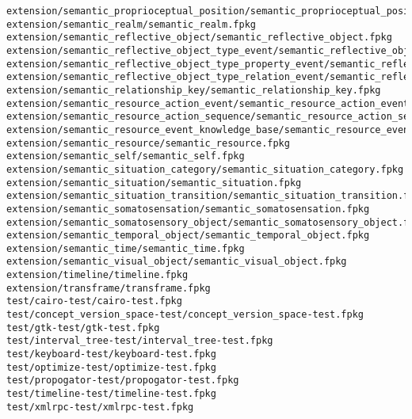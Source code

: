 \begin{lstlisting}
extension/semantic_proprioceptual_position/semantic_proprioceptual_position.fpkg
extension/semantic_realm/semantic_realm.fpkg
extension/semantic_reflective_object/semantic_reflective_object.fpkg
extension/semantic_reflective_object_type_event/semantic_reflective_object_type_event.fpkg
extension/semantic_reflective_object_type_property_event/semantic_reflective_object_type_property_event.fpkg
extension/semantic_reflective_object_type_relation_event/semantic_reflective_object_type_relation_event.fpkg
extension/semantic_relationship_key/semantic_relationship_key.fpkg
extension/semantic_resource_action_event/semantic_resource_action_event.fpkg
extension/semantic_resource_action_sequence/semantic_resource_action_sequence.fpkg
extension/semantic_resource_event_knowledge_base/semantic_resource_event_knowledge_base.fpkg
extension/semantic_resource/semantic_resource.fpkg
extension/semantic_self/semantic_self.fpkg
extension/semantic_situation_category/semantic_situation_category.fpkg
extension/semantic_situation/semantic_situation.fpkg
extension/semantic_situation_transition/semantic_situation_transition.fpkg
extension/semantic_somatosensation/semantic_somatosensation.fpkg
extension/semantic_somatosensory_object/semantic_somatosensory_object.fpkg
extension/semantic_temporal_object/semantic_temporal_object.fpkg
extension/semantic_time/semantic_time.fpkg
extension/semantic_visual_object/semantic_visual_object.fpkg
extension/timeline/timeline.fpkg
extension/transframe/transframe.fpkg
test/cairo-test/cairo-test.fpkg
test/concept_version_space-test/concept_version_space-test.fpkg
test/gtk-test/gtk-test.fpkg
test/interval_tree-test/interval_tree-test.fpkg
test/keyboard-test/keyboard-test.fpkg
test/optimize-test/optimize-test.fpkg
test/propogator-test/propogator-test.fpkg
test/timeline-test/timeline-test.fpkg
test/xmlrpc-test/xmlrpc-test.fpkg
\end{lstlisting}

